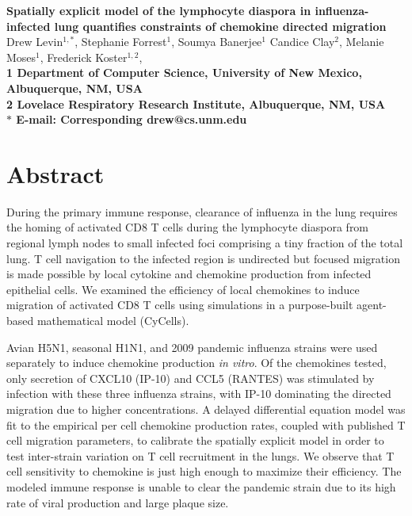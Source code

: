 \documentclass[10pt]{article}
\date{}
\begin{document}
\begin{flushleft}
{\Large
\textbf{Spatially explicit model of the lymphocyte diaspora in influenza-infected lung quantifies constraints of chemokine directed migration}
}
\\
Drew Levin$^{1,\ast}$, 
Stephanie Forrest$^{1}$, 
Soumya Banerjee$^{1}$
Candice Clay$^{2}$, 
Melanie Moses$^{1}$, 
Frederick Koster$^{1,2}$, 
\\
\bf{1} Department of Computer Science, University of New Mexico, Albuquerque, NM, USA
\\
\bf{2} Lovelace Respiratory Research Institute, Albuquerque, NM, USA
\\
$\ast$ E-mail: Corresponding drew@cs.unm.edu
\end{flushleft}



\section*{Abstract}

During the primary immune response, clearance of influenza in the lung requires the homing of activated CD8 T cells during the lymphocyte diaspora from regional lymph nodes to small infected foci comprising a tiny fraction of the total lung.  T cell navigation to the infected region is undirected but focused migration is made possible by local cytokine and chemokine production from infected epithelial cells.  We examined the efficiency of local chemokines to induce migration of activated CD8 T cells using simulations in a purpose-built agent-based mathematical model (CyCells).  

Avian H5N1, seasonal H1N1, and 2009 pandemic influenza strains were used separately to induce chemokine production \textit{in vitro}.  Of the chemokines tested, only secretion of CXCL10 (IP-10) and CCL5 (RANTES) was stimulated by infection with these three influenza strains, with IP-10 dominating the directed migration due to higher concentrations.  A delayed differential equation model was fit to the empirical per cell chemokine production rates, coupled with published T cell migration parameters, to calibrate the spatially explicit model in order to test inter-strain variation on T cell recruitment in the lungs.  We observe that T cell sensitivity to chemokine is just high enough to maximize their efficiency.  The modeled immune response is unable to clear the pandemic strain due to its high rate of viral production and large plaque size.  
\end{document}
